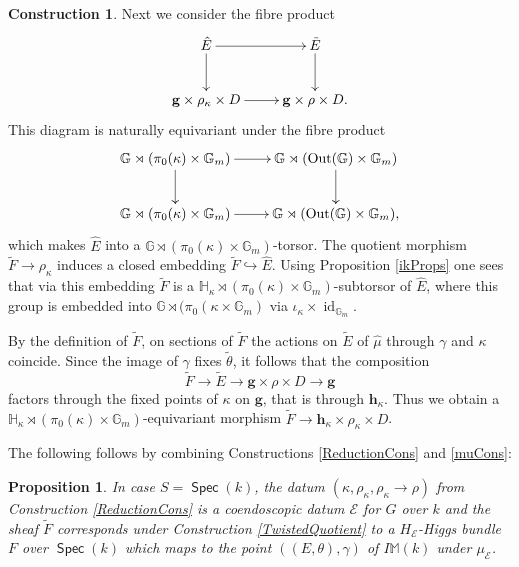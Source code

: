\documentclass{article}
\DeclareMathOperator{\id}{id}
\DeclareMathOperator{\Spec}{\mathsf{Spec}}
\newcommand{\BG}{{\mathbb{G}}}
\newcommand{\BH}{{\mathbb{H}}}
\newcommand{\BM}{{\mathbb{M}}}
\newcommand{\CE}{{\mathcal E}}
\DeclareMathOperator{\Out}{Out}
\let\into\hookrightarrow
\theoremstyle{definition}
\newtheorem{construction}[definition]{Construction}
\theoremstyle{plain}
\newtheorem{proposition}[definition]{Proposition}
\begin{document}
\begin{construction}
 Next we consider the fibre product
\begin{equation*}
  \xymatrix{
    \hat E \ar[r] \ar[d] & \tilde E \ar[d] \\
    \mathbf{g} \times \rho_\kappa \times D \ar[r] & \mathbf{g} \times \rho \times D.
}
\end{equation*}
This diagram is naturally equivariant under the fibre product
\begin{equation*}
  \xymatrix{
    \BG \rtimes (\pi_0(\kappa) \times \BG_m) \ar[r] \ar[d] & \BG \rtimes (\Out(\BG) \times \BG_m) \ar[d]\\
    \BG \rtimes (\pi_0(\kappa) \times \BG_m) \ar[r] & \BG \rtimes (\Out(\BG) \times \BG_m) ,
  }
\end{equation*}
which makes $\hat E$ into a $\BG \rtimes (\pi_0(\kappa) \times \BG_m)$-torsor. The quotient morphism $\tilde F \to \rho_\kappa$ induces a closed embedding $\tilde F \into \hat E$. Using Proposition \ref{ikProps} one sees that via this embedding $\tilde F$ is a $\BH_\kappa \rtimes (\pi_0(\kappa) \times \BG_m)$-subtorsor of $\hat E$, where this group is embedded into $\BG \rtimes (\pi_0(\kappa \times \BG_m)$ via $\iota_\kappa \times \id_{\BG_m}$.

By the definition of $\tilde F$, on sections of $\tilde F$ the actions on $\tilde E$ of $\hat\mu$ through $\gamma$ and $\kappa$ coincide. Since the image of $\gamma$ fixes $\tilde\theta$, it follows that the composition
\begin{equation*}
  \tilde F \to \tilde E \to \mathbf{g}\times \rho \times D \to \mathbf{g}
\end{equation*}
factors through the fixed points of $\kappa$ on $\mathbf{g}$, that is through $\mathbf{h}_\kappa$. Thus we obtain a $\BH_\kappa \rtimes (\pi_0(\kappa) \times \BG_m)$-equivariant morphism $\tilde F \to \mathbf{h}_\kappa \times \rho_\kappa \times D$. %

\end{construction}

The following follows by combining Constructions \ref{ReductionCons} and \ref{muCons}: 
\begin{proposition} \label{kCase}
  In case $S=\Spec(k)$, the datum $(\kappa,\rho_\kappa,\rho_\kappa \to \rho)$ from Construction \ref{ReductionCons} is a coendoscopic datum $\CE$ for $G$ over $k$ and the sheaf $\tilde F$ corresponds under Construction \ref{TwistedQuotient} to a $H_\CE$-Higgs bundle $F$ over $\Spec(k)$ which maps to the point $((E,\theta),\gamma)$ of $I\BM(k)$ under $\mu_\CE$. 
\end{proposition}
\end{document}
